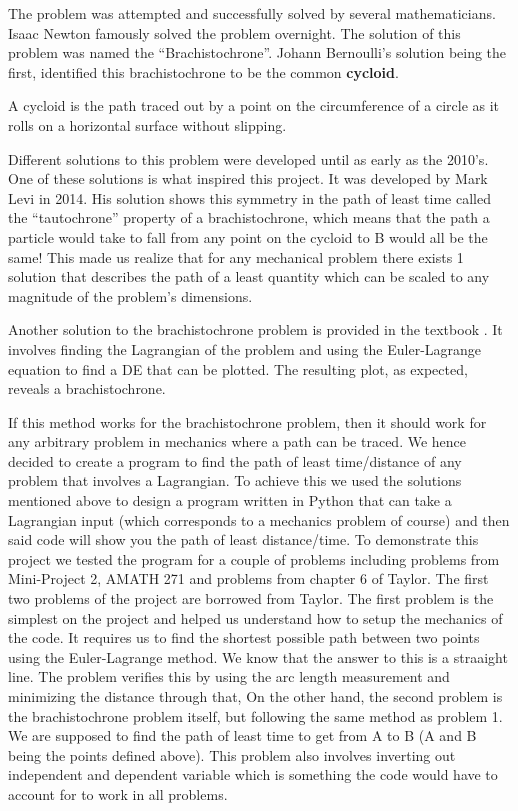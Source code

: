 \documentclass[hidelinks, 11pt]{article}
\begin{document}
The problem was attempted and successfully solved by several mathematicians. Isaac Newton famously solved the problem overnight. The solution of this problem was named the ``Brachistochrone''.  Johann Bernoulli's solution being the first, identified this brachistochrone to be the common \textbf{cycloid}. 


A cycloid is the path traced out by a point on the circumference of a circle as it rolls on a horizontal surface without slipping. 

Different solutions to this problem were developed until as early as the 2010's. One of these solutions is what inspired this project. It was developed by Mark Levi \cite{Levi2014} in 2014. His solution shows this symmetry in the path of least time called the ``tautochrone'' property of a brachistochrone, which means that the path a particle would take to fall from any point on the cycloid to B would all be the same! This made us realize that for any mechanical problem there exists 1 solution that describes the path of a least quantity which can be scaled to any magnitude of the problem’s dimensions. 

Another solution to the brachistochrone problem is provided in the textbook \cite{Taylor2005}. It involves finding the Lagrangian of the problem and using the Euler-Lagrange equation to find a DE that can be plotted. The resulting plot, as expected, reveals a brachistochrone.

If this method works for the brachistochrone problem, then it should work for any arbitrary problem in mechanics where a path can be traced. 
We hence decided to create a program to find the path of least time/distance of any problem that involves a Lagrangian. To achieve this we used the solutions mentioned above to design a program written in Python that can take a Lagrangian input (which corresponds to a mechanics problem of course) and then said code will show you the path of least distance/time. 
To demonstrate this project we tested the program for a couple of problems including problems from Mini-Project 2, AMATH 271 and problems from chapter 6 of Taylor.
The first two problems of the project are borrowed from Taylor. The first problem is the simplest on the project and helped us understand how to setup the mechanics of the code. It requires us to find the shortest possible path between two points using the Euler-Lagrange method. We know that the answer to this is a straaight line. The problem verifies this by using the arc length measurement and minimizing the distance through that, On the other hand, the second problem is the brachistochrone problem itself, but following the same method as problem 1. We are supposed to find the path of least time to get from A to B (A and B being the points defined above). This problem also involves inverting out independent and dependent variable which is something the code would have to account for to work in all problems. 
\end{document}
